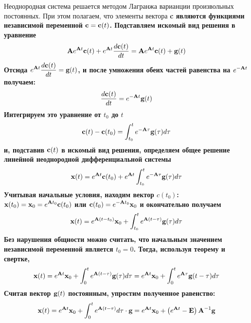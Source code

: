 Неоднородная система решается методом Лагранжа варианции произвольных постоянных. При этом полагаем, что элементы вектора
\bf{c} являются функциями независимой переменной $\bf{c} = \bf{c}(t)$. Подставляем искомый вид решения в уравнение
\begin{equation*}
    \bf{A}e^{\bf{A}t}\bf{c}(t) + e^{\bf{A}t}\frac{d\bf{c}(t)}{dt} = \bf{A} e^{\bf{A}t}\bf{c}(t) + \bf{g}(t)
\end{equation*}
Отсюда $\displaystyle e^{\bf{A}t}\frac{d\bf{c}(t)}{dt} = \bf{g}(t)$, и после умножения обеих частей равенства на
$\displaystyle e^{-\bf{A}t}$ получаем:
\begin{equation*}
    \frac{d\bf{c}(t)}{dt} = e^{-\bf{A}t}\bf{g}(t)
\end{equation*}
Интегрируем это уравнение от $t_0$ до $t$
\begin{equation*}
    \bf{c}(t) - \bf{c}(t_0) = \int_{t_0}^{t} e^{-\bf{A}\tau}\bf{g}(\tau)d\tau
\end{equation*}
и, подставив $\bf{c}(t)$ в искомый вид решения, определяем общее решение линейной неоднородной дифференциальной системы
\begin{equation*}
    \bf{x}(t) = e^{\bf{A}t}\bf{c}(t_0) + e^{\bf{A}t}\int_{t_0}^{t}e^{-\bf{A}\tau}\bf{g}(\tau)d\tau
\end{equation*}
Учитывая начальные условия, находим вектор $\displaystyle c(t_0)$: $\displaystyle \bf{x}(t_0) = \bf{x}_0 = e^{\bf{A}t_0}\bf{c}(t_0)$
или $\displaystyle \bf{c}(t_0) = e^{-\bf{A}t_0}\bf{x}_0$ и окончательно получаем
\begin{equation*}
    \bf{x}(t) = e^{\bf{A}(t - t_0)}\bf{x}_0 + \int_{t_0}^{t} e^{\bf{A}(t - \tau)}\bf{g}(\tau)d\tau
\end{equation*}
Без нарушения общности можно считать, что начальным значением независимой переменной является $\displaystyle t_0 = 0$.
Тогда, используя теорему и свертке,
\begin{equation}
    \bf{x}(t) = e^{\bf{A}t}\bf{x}_0 + \int_{0}^{t} e^{\bf{A}(t - \tau)}\bf{g}(\tau)d\tau = e^{\bf{A}t}\bf{x}_0 + \int_{0}^{t} e^{\bf{A}\tau}\bf{g}(t - \tau)d\tau \label{eq:1}
\end{equation}
Считая вектор $\bf{g}(t)$ постоянным, упростим полученное равенство:
\begin{equation*}
    \bf{x}(t) = e^{\bf{A}t}\bf{x}_0 + \int_{0}^{t} e^{\bf{A}(t - \tau)}d\tau \cdot \bf{g} = e^{\bf{A}t}\bf{x}_0 + \left( e^{\bf{A}t} - \bf{E} \right)\bf{A}^{-1}\bf{g}
\end{equation*}

